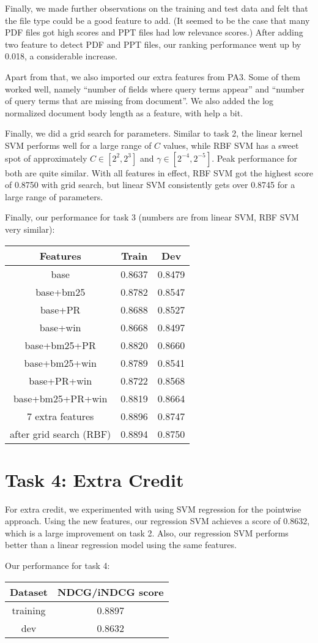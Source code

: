 \documentclass[10pt,twocolumn]{article}
\begin{document}
Finally, we made further observations on the training and test data and felt that the file type could be a good feature to add. (It seemed to be the case that many PDF files got high scores and PPT files had low relevance scores.) After adding two feature to detect PDF and PPT files, our ranking performance went up by 0.018, a considerable increase.

Apart from that, we also imported our extra features from PA3. Some of them worked well, namely ``number of fields where query terms appear'' and ``number of query terms that are missing from document''. We also added the log normalized document body length as a feature, with help a bit.

Finally, we did a grid search for parameters. Similar to task 2, the linear kernel SVM performs well for a large range of $C$ values, while RBF SVM has a sweet spot of approximately $C\in[2^{2},2^{3}]$ and $\gamma\in[2^{-4},2^{-5}]$. Peak performance for both are quite similar. With all features in effect, RBF SVM got the highest score of 0.8750 with grid search, but linear SVM consistently gets over 0.8745 for a large range of parameters.

Finally, our performance for task 3 (numbers are from linear SVM, RBF SVM very similar):
\begin{table}[H] 
\centering
\begin{tabular}{|c|c|c|}
\hline
Features &Train& Dev \\\hline
base & 0.8637 & 0.8479\\\hline
base+bm25 & 0.8782 & 0.8547\\\hline
base+PR & 0.8688 & 0.8527\\\hline
base+win & 0.8668 & 0.8497\\\hline
base+bm25+PR & 0.8820 & 0.8660\\\hline
base+bm25+win & 0.8789 & 0.8541\\\hline
base+PR+win & 0.8722 & 0.8568\\\hline
base+bm25+PR+win & 0.8819 & 0.8664\\\hline
7 extra features & 0.8896 & 0.8747\\\hline
after grid search (RBF)  & 0.8894 & 0.8750\\\hline
\end{tabular}
\end{table}

\section*{Task 4: Extra Credit}
For extra credit, we experimented with using SVM regression for the pointwise approach. Using the new features, our regression SVM achieves a score of 0.8632, which is a large improvement on task 2. Also, our regression SVM performs better than a linear regression model using the same features.

Our performance for task 4:
\begin{table}[H]
\centering
\begin{tabular}{|c|c|}
\hline
Dataset & NDCG/iNDCG score \\\hline
training & 0.8897\\\hline
dev & 0.8632\\\hline
\end{tabular}
\end{table}
\end{document}
